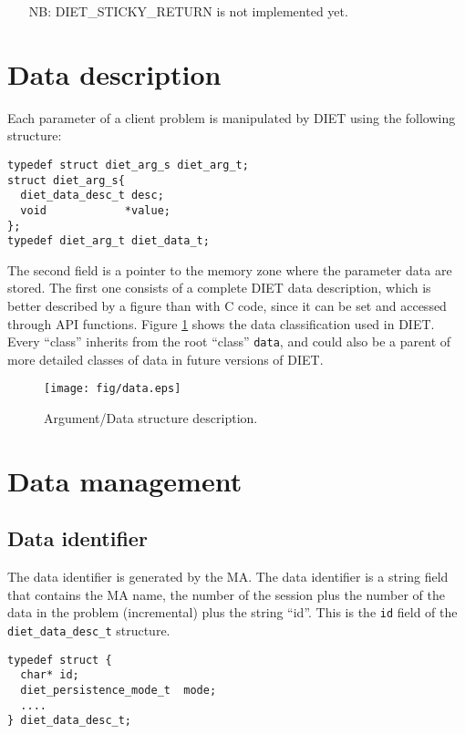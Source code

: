 \begin{itemize}
\item[NB:] \textsf{DIET\_STICKY\_RETURN} is not implemented yet.
\end{itemize}

\section{Data description}
\label{sec:datadesc}

Each parameter of a client problem is manipulated by DIET using the following
structure:
{\footnotesize
\begin{verbatim}
typedef struct diet_arg_s diet_arg_t;
struct diet_arg_s{
  diet_data_desc_t desc;
  void            *value;
};
typedef diet_arg_t diet_data_t;
\end{verbatim}
}

The second field is a pointer to the memory zone where the parameter data are
stored. The first one consists of a complete DIET data description, which is
better described by a figure than with C code, since it can be set and accessed
through API functions. Figure \ref{fig:data} shows the data classification used
in DIET. Every ``class'' inherits from the root ``class'' \texttt{data}, and
could also be a parent of more detailed classes of data in future versions of
DIET.

\begin{figure}[hpt]
 \begin{center}
  \texttt{[image: fig/data.eps]}
  \caption{Argument/Data structure description.}
  \label{fig:data}
 \end{center}
\end{figure}


\section{Data management}
\label{sec:datamgt}

\subsection{Data identifier}
\label{ssec:dataid}
The data identifier is generated by the MA. The data identifier is a
string field that contains the MA name, the number of the session plus
the number of the data in the problem (incremental) plus the string
``id''.  This is the \texttt{id} field of the
\texttt{diet\_data\_desc\_t} structure.

{\footnotesize
\begin{verbatim}
typedef struct {
  char* id;  
  diet_persistence_mode_t  mode;
  ....
} diet_data_desc_t;
\end{verbatim}
}


